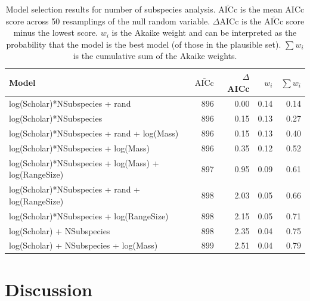 \begin{table}[t]
\begin{tabular}{>{\small}lrrrr}

\normalsize{Model} & $\bar{\text{AICc}}$ & $\Delta$AICc & $w_i$ & $\sum w_i$\\
\hline
log(Scholar)*NSubspecies + rand & 
896 & 0.00 &
0.14 & 0.14\\
log(Scholar)*NSubspecies & 
896 & 0.15 &
0.13 & 0.27\\
log(Scholar)*NSubspecies + rand + log(Mass) & 
896 & 0.15 &
0.13 & 0.40\\
log(Scholar)*NSubspecies  + log(Mass) & 
896 & 0.35 &
0.12 & 0.52\\
log(Scholar)*NSubspecies  + log(Mass) + log(RangeSize) & 
897 & 0.95 &
0.09 & 0.61\\
log(Scholar)*NSubspecies  + rand + log(RangeSize) & 
898 & 2.03 &
0.05 & 0.66\\
log(Scholar)*NSubspecies  + log(RangeSize) & 
898 & 2.15 &
0.05 & 0.71\\
log(Scholar) + NSubspecies & 
898 & 2.35 &
0.04 & 0.75\\
log(Scholar) + NSubspecies + log(Mass) & 
899 & 2.51 &
0.04 & 0.79
\end{tabular}
\caption[Model selection results for number of subspecies analysis]{
Model selection results for number of subspecies analysis. 
$\bar{\text{AICc}}$ is the mean AICc score across 50 resamplings of the null random variable. 
$\Delta$AICc is the $\bar{\text{AICc}}$ score minus the lowest score. 
$w_i$ is the Akaike weight and can be interpreted as the probability that the model is the best model (of those in the plausible set).
$\sum w_i$ is the cumulative sum of the Akaike weights.}
\label{t:subsmodels}
\end{table}





\clearpage
\section{Discussion}  

















